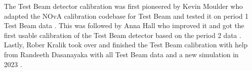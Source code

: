 \documentclass[12pt,a4paper]{article}
\begin{document}
The Test Beam detector calibration was first pioneered by Kevin Moulder who adapted the NOvA calibration codebase for Test Beam and tested it on period 1 Test Beam data \cite{NOVA-doc-42700}. This was followed by Anna Hall who improved it and got the first usable calibration of the Test Beam detector based on the period 2 data \cite{NOVA-doc-50786}. Lastly, Rober Kralik took over and finished the Test Beam calibration with help from Randeeth Dasanayaka with all Test Beam data and a new simulation in 2023 \cite{NOVA-doc-59024}.

\end{document}
